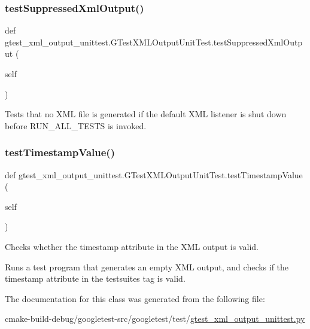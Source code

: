 \subsubsection{\texorpdfstring{testSuppressedXmlOutput()}{testSuppressedXmlOutput()}}
{\footnotesize\ttfamily def gtest\+\_\+xml\+\_\+output\+\_\+unittest.\+G\+Test\+X\+M\+L\+Output\+Unit\+Test.\+test\+Suppressed\+Xml\+Output (\begin{DoxyParamCaption}\item[{}]{self }\end{DoxyParamCaption})}

\begin{DoxyVerb}Tests that no XML file is generated if the default XML listener is
shut down before RUN_ALL_TESTS is invoked.
\end{DoxyVerb}
 \mbox{\label{classgtest__xml__output__unittest_1_1GTestXMLOutputUnitTest_a828521a7ae57f650e1e9ca4beb34336a}} 
\subsubsection{\texorpdfstring{testTimestampValue()}{testTimestampValue()}}
{\footnotesize\ttfamily def gtest\+\_\+xml\+\_\+output\+\_\+unittest.\+G\+Test\+X\+M\+L\+Output\+Unit\+Test.\+test\+Timestamp\+Value (\begin{DoxyParamCaption}\item[{}]{self }\end{DoxyParamCaption})}

\begin{DoxyVerb}Checks whether the timestamp attribute in the XML output is valid.

Runs a test program that generates an empty XML output, and checks if
the timestamp attribute in the testsuites tag is valid.
\end{DoxyVerb}
 

The documentation for this class was generated from the following file\+:\begin{DoxyCompactItemize}
\item 
cmake-\/build-\/debug/googletest-\/src/googletest/test/\mbox{\hyperlink{gtest__xml__output__unittest_8py}{gtest\+\_\+xml\+\_\+output\+\_\+unittest.\+py}}\end{DoxyCompactItemize}
